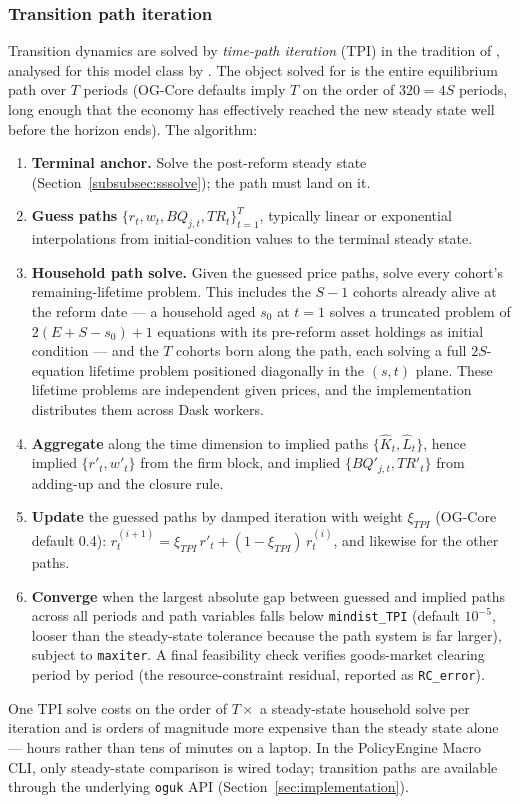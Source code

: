 \subsubsection{Transition path iteration}
\label{subsubsec:tpi}

Transition dynamics are solved by \emph{time-path iteration} (TPI) in the tradition of \citet{AuerbachKotlikoff1987}, analysed for this model class by \citet{EvansPhillips2014}. The object solved for is the entire equilibrium path over $T$ periods (OG-Core defaults imply $T$ on the order of $320 = 4S$ periods, long enough that the economy has effectively reached the new steady state well before the horizon ends). The algorithm:
\begin{enumerate}
\item \textbf{Terminal anchor.} Solve the post-reform steady state (Section~\ref{subsubsec:sssolve}); the path must land on it.
\item \textbf{Guess paths} $\{r_t, w_t, BQ_{j,t}, TR_t\}_{t=1}^{T}$, typically linear or exponential interpolations from initial-condition values to the terminal steady state.
\item \textbf{Household path solve.} Given the guessed price paths, solve every cohort's remaining-lifetime problem. This includes the $S-1$ cohorts already alive at the reform date --- a household aged $s_0$ at $t=1$ solves a truncated problem of $2(E{+}S{-}s_0)+1$ equations with its pre-reform asset holdings as initial condition --- and the $T$ cohorts born along the path, each solving a full $2S$-equation lifetime problem positioned diagonally in the $(s,t)$ plane. These lifetime problems are independent given prices, and the implementation distributes them across Dask workers.
\item \textbf{Aggregate} along the time dimension to implied paths $\{\hat K_t, \hat L_t\}$, hence implied $\{r'_t, w'_t\}$ from the firm block, and implied $\{BQ'_{j,t}, TR'_t\}$ from adding-up and the closure rule.
\item \textbf{Update} the guessed paths by damped iteration with weight $\xi_{TPI}$ (OG-Core default 0.4): $r^{(i+1)}_t = \xi_{TPI}\, r'_t + (1-\xi_{TPI})\, r^{(i)}_t$, and likewise for the other paths.
\item \textbf{Converge} when the largest absolute gap between guessed and implied paths across all periods and path variables falls below \texttt{mindist\_TPI} (default $10^{-5}$, looser than the steady-state tolerance because the path system is far larger), subject to \texttt{maxiter}. A final feasibility check verifies goods-market clearing period by period (the resource-constraint residual, reported as \texttt{RC\_error}).
\end{enumerate}
One TPI solve costs on the order of $T\times$ a steady-state household solve per iteration and is orders of magnitude more expensive than the steady state alone --- hours rather than tens of minutes on a laptop. In the PolicyEngine Macro CLI, only steady-state comparison is wired today; transition paths are available through the underlying \texttt{oguk} API (Section~\ref{sec:implementation}).
